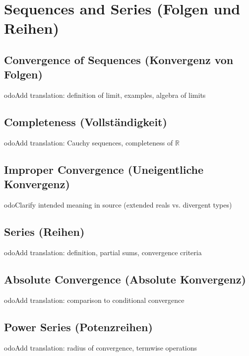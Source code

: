 \documentclass[12pt,a4paper]{article}
\newcommand{\R}{\mathbb{R}}
\theoremstyle{plain}
\theoremstyle{definition}
\theoremstyle{remark}
\begin{document}
\section{Sequences and Series (Folgen und Reihen)}

\subsection{Convergence of Sequences (Konvergenz von Folgen)}
	odo{Add translation: definition of limit, examples, algebra of limits}

\subsection{Completeness (Vollständigkeit)}
	odo{Add translation: Cauchy sequences, completeness of $\R$}

\subsection{Improper Convergence (Uneigentliche Konvergenz)}
	odo{Clarify intended meaning in source (extended reals vs. divergent types)}

\subsection{Series (Reihen)}
	odo{Add translation: definition, partial sums, convergence criteria}

\subsection{Absolute Convergence (Absolute Konvergenz)}
	odo{Add translation: comparison to conditional convergence}

\subsection{Power Series (Potenzreihen)}
	odo{Add translation: radius of convergence, termwise operations}

\end{document}

